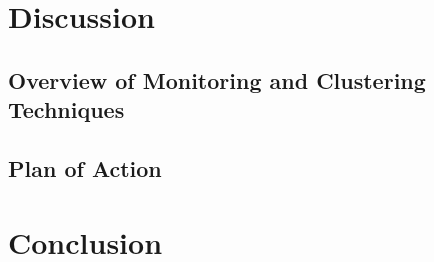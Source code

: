 \newpage
\chapter{Discussion}

\section{Overview of Monitoring and Clustering Techniques}

\section{Plan of Action}

\chapter{Conclusion}


